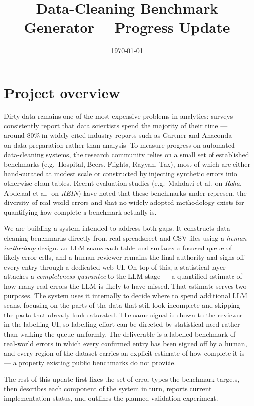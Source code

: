 \documentclass[11pt]{article}
\title{Data-Cleaning Benchmark Generator\,---\,Progress Update}
\author{}
\date{\today}
\begin{document}
\maketitle
\vspace{-0.6em}

\section*{Project overview}
Dirty data remains one of the most expensive problems in
analytics: surveys consistently report that data scientists
spend the majority of their time --- around 80\% in widely
cited industry reports such as Gartner and Anaconda --- on
data preparation rather than analysis. To measure progress on
automated data-cleaning systems, the research community relies
on a small set of established benchmarks (e.g.\ Hospital,
Beers, Flights, Rayyan, Tax), most of which are either
hand-curated at modest scale or constructed by injecting
synthetic errors into otherwise clean tables. Recent
evaluation studies (e.g.\ Mahdavi et al.\ on \emph{Raha},
Abdelaal et al.\ on \emph{REIN}) have noted that these
benchmarks under-represent the diversity of real-world errors
and that no widely adopted methodology exists for quantifying
how complete a benchmark actually is.

We are building a system intended to address both gaps. It
constructs data-cleaning benchmarks directly from real
spreadsheet and CSV files using a \emph{human-in-the-loop}
design: an LLM scans each table and surfaces a focused queue
of likely-error cells, and a human reviewer remains the final
authority and signs off every entry through a dedicated web
UI. On top of this, a statistical layer attaches a
\emph{completeness guarantee} to the LLM stage --- a
quantified estimate of how many real errors the LLM is
likely to have missed. That estimate serves two purposes.
The system uses it internally to decide where to spend
additional LLM scans, focusing on the parts of the data that
still look incomplete and skipping the parts that already
look saturated. The same signal is shown to the reviewer in
the labelling UI, so labelling effort can be directed by
statistical need rather than walking the queue uniformly.
The deliverable is a labelled benchmark of real-world errors
in which every confirmed entry has been signed off by a
human, and every region of the dataset carries an explicit
estimate of how complete it is --- a property existing
public benchmarks do not provide.

The rest of this update first fixes the set of error types the
benchmark targets, then describes each component of the system
in turn, reports current implementation status, and outlines
the planned validation experiment.
\end{document}
